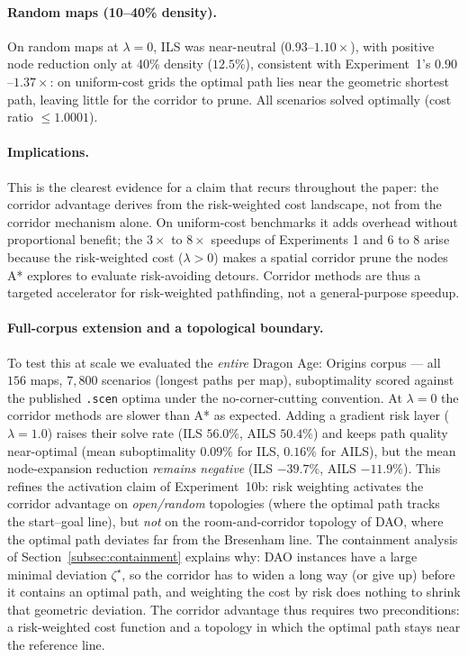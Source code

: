 \documentclass[11pt]{article}
\begin{document}
\paragraph{Random maps (10--40\% density).}
On random maps at $\lambda = 0$, ILS was near-neutral ($0.93$--$1.10\times$), with positive node reduction only at 40\% density ($12.5\%$), consistent with Experiment~1's $0.90$--$1.37\times$: on uniform-cost grids the optimal path lies near the geometric shortest path, leaving little for the corridor to prune. All scenarios solved optimally (cost ratio $\leq 1.0001$).

\paragraph{Implications.}
This is the clearest evidence for a claim that recurs throughout the paper: the corridor advantage derives from the risk-weighted cost landscape, not from the corridor mechanism alone. On uniform-cost benchmarks it adds overhead without proportional benefit; the $3\times$ to $8\times$ speedups of Experiments 1 and 6 to 8 arise because the risk-weighted cost ($\lambda > 0$) makes a spatial corridor prune the nodes A* explores to evaluate risk-avoiding detours. Corridor methods are thus a targeted accelerator for risk-weighted pathfinding, not a general-purpose speedup.

\paragraph{Full-corpus extension and a topological boundary.}
To test this at scale we evaluated the \emph{entire} Dragon Age: Origins corpus --- all $156$ maps, $7{,}800$ scenarios (longest paths per map), suboptimality scored against the published \texttt{.scen} optima under the no-corner-cutting convention. At $\lambda = 0$ the corridor methods are slower than A* as expected. Adding a gradient risk layer ($\lambda = 1.0$) raises their solve rate (ILS $56.0\%$, AILS $50.4\%$) and keeps path quality near-optimal (mean suboptimality $0.09\%$ for ILS, $0.16\%$ for AILS), but the mean node-expansion reduction \emph{remains negative} (ILS $-39.7\%$, AILS $-11.9\%$). This refines the activation claim of Experiment~10b: risk weighting activates the corridor advantage on \emph{open/random} topologies (where the optimal path tracks the start--goal line), but \emph{not} on the room-and-corridor topology of DAO, where the optimal path deviates far from the Bresenham line. The containment analysis of Section~\ref{subsec:containment} explains why: DAO instances have a large minimal deviation $\zeta^\star$, so the corridor has to widen a long way (or give up) before it contains an optimal path, and weighting the cost by risk does nothing to shrink that geometric deviation. The corridor advantage thus requires two preconditions: a risk-weighted cost function and a topology in which the optimal path stays near the reference line.
\end{document}
